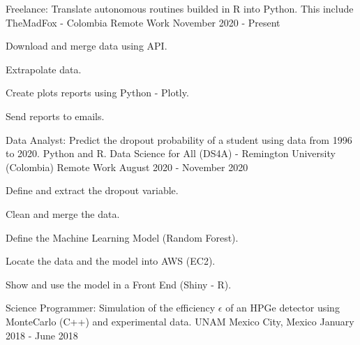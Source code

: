 \begin{cventries}
  \cventry
    {Freelance: Translate autonomous routines builded in R into Python. This include } %
    {TheMadFox - Colombia} %
    {Remote Work} %
    {November 2020 - Present} %
    {
      \begin{cvitems} %
\item {Download and merge data using API.}
\item {Extrapolate data.}
\item {Create plots reports using Python - Plotly. }
\item {Send reports to emails.}
      \end{cvitems}
    }
  \cventry
  	{Data Analyst: Predict the dropout probability of a student using data from 1996 to 2020. Python and R. }%
    {Data Science for All (DS4A) - Remington University (Colombia)} %
    {Remote Work} %
    {August 2020 - November 2020} %
    {
      \begin{cvitems} %
\item {Define and extract the dropout variable.}
\item {Clean and merge the data.}
\item {Define the Machine Learning Model (Random Forest).}
\item {Locate the data and the model into AWS (EC2).}
\item {Show and use the model in a Front End (Shiny - R).}
      \end{cvitems}
    }
  \cventry
  	{Science Programmer: Simulation of the efficiency $\epsilon$ of an HPGe detector using MonteCarlo (C++) and experimental data.}%
    {UNAM} %
    {Mexico City, Mexico} %
    {January 2018 - June 2018} %
    {}
\end{cventries}
